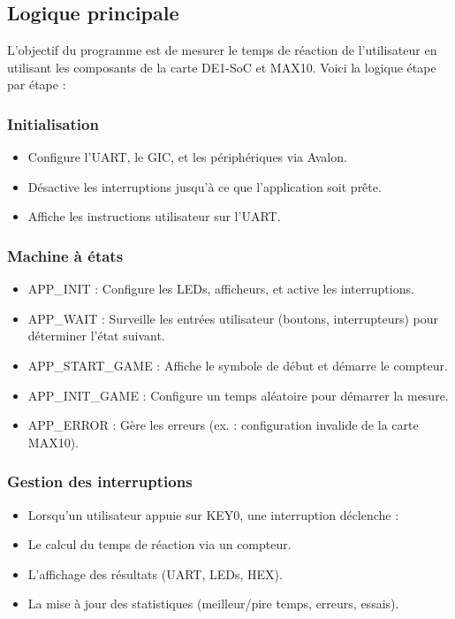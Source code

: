 \documentclass[a4paper,12pt]{article}
\begin{document}
\subsection{Logique principale}

L'objectif du programme est de mesurer le temps de réaction de l'utilisateur en utilisant les composants de la carte DE1-SoC et MAX10. Voici la logique étape par étape :

\subsubsection{Initialisation}

\begin{itemize}
    \item Configure l’UART, le GIC, et les périphériques via Avalon.
    \item Désactive les interruptions jusqu'à ce que l'application soit prête.
    \item Affiche les instructions utilisateur sur l’UART.
\end{itemize}

\subsubsection{Machine à états}

\begin{itemize}
    \item APP\_INIT : Configure les LEDs, afficheurs, et active les interruptions.
    \item APP\_WAIT : Surveille les entrées utilisateur (boutons, interrupteurs) pour déterminer l’état suivant.
    \item APP\_START\_GAME : Affiche le symbole de début et démarre le compteur.
    \item APP\_INIT\_GAME : Configure un temps aléatoire pour démarrer la mesure.
    \item APP\_ERROR : Gère les erreurs (ex. : configuration invalide de la carte MAX10).
\end{itemize}

\subsubsection{Gestion des interruptions}

\begin{itemize}
    \item Lorsqu'un utilisateur appuie sur KEY0, une interruption déclenche :
    \item Le calcul du temps de réaction via un compteur.
    \item L’affichage des résultats (UART, LEDs, HEX).
    \item La mise à jour des statistiques (meilleur/pire temps, erreurs, essais).
\end{itemize}
\end{document}
